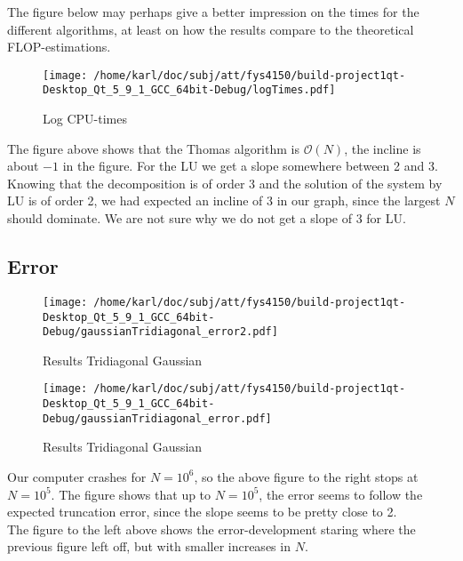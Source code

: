 \documentclass{article}
\begin{document}
The figure below may perhaps give a better impression on the times for the different algorithms, at least on how the results compare to the theoretical FLOP-estimations.

\begin{figure}[H]
	\centering
	\texttt{[image: /home/karl/doc/subj/att/fys4150/build-project1qt-Desktop\_Qt\_5\_9\_1\_GCC\_64bit-Debug/logTimes.pdf]}
	\caption{Log CPU-times}
\end{figure}

The figure above shows that the Thomas algorithm is $\mathcal{O}(N)$, the incline is about $-1$ in the figure. For the LU we get a slope somewhere between 2 and 3. Knowing that the decomposition is of order 3 and the solution of the system by LU is of order 2, we had expected an incline of 3 in our graph, since the largest $N$ should dominate. We are not sure why we do not get a slope of 3 for LU. 

\subsection{Error}
\begin{minipage}{.49\textwidth} %
\begin{figure}[H]
	\centering
	\texttt{[image: /home/karl/doc/subj/att/fys4150/build-project1qt-Desktop\_Qt\_5\_9\_1\_GCC\_64bit-Debug/gaussianTridiagonal\_error2.pdf]}
	\caption{Results Tridiagonal Gaussian}
	\label{1}
\end{figure}
\end{minipage}\hfill
\begin{minipage}{.49\textwidth}
\begin{figure}[H]
	\centering
	\texttt{[image: /home/karl/doc/subj/att/fys4150/build-project1qt-Desktop\_Qt\_5\_9\_1\_GCC\_64bit-Debug/gaussianTridiagonal\_error.pdf]}
	\caption{Results Tridiagonal Gaussian}
	\label{1}
\end{figure}

\end{minipage}\hfill




Our computer crashes for $N = 10^6$, so the above figure to the right stops at $N = 10^5$. The figure shows that up to $N = 10^5$, the error seems to follow the expected truncation error, since the slope seems to be pretty close to 2.\\

The figure to the left above shows the error-development staring where the previous figure left off, but with smaller increases in $N$.
\end{document}
